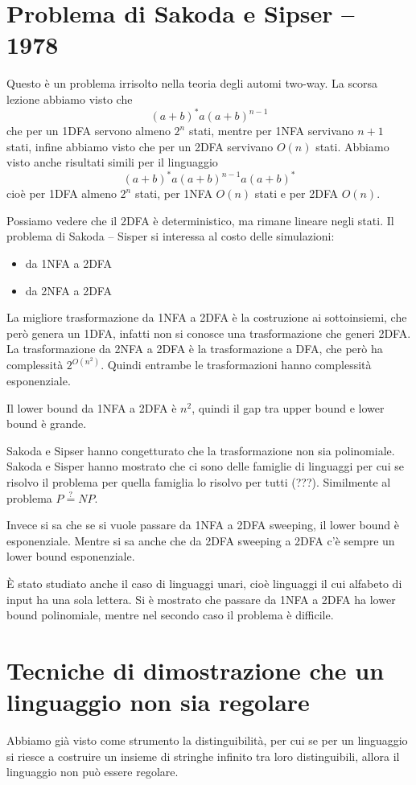 \documentclass[12pt]{article}
\begin{document}
\tableofcontents
\newpage
\section{Problema di Sakoda e Sipser -- 1978}
Questo è un problema irrisolto nella teoria degli automi two-way.
La scorsa lezione abbiamo visto che 
$$ (a + b)^* a (a + b)^{n - 1} $$ %
che per un 1DFA servono almeno $2^n$ stati, mentre per 1NFA servivano $n + 1$ stati, infine abbiamo visto che per un 2DFA servivano $O(n)$ stati.
Abbiamo visto anche risultati simili per il linguaggio
$$ (a + b)^* a (a + b)^{n - 1} a (a + b)^* $$
cioè per 1DFA almeno $2^n$ stati, per 1NFA $O(n)$ stati e per 2DFA $O(n)$.

Possiamo vedere che il 2DFA è deterministico, ma rimane lineare negli stati.
Il problema di Sakoda -- Sisper si interessa al costo delle simulazioni:
\begin{itemize}
	\item da 1NFA a 2DFA
	\item da 2NFA a 2DFA
\end{itemize}
La migliore trasformazione da 1NFA a 2DFA è la costruzione ai sottoinsiemi, che però genera un 1DFA, infatti non si conosce una trasformazione che generi 2DFA.
La trasformazione da 2NFA a 2DFA è la trasformazione a DFA, che però ha complessità $2^{O(n^2)}$.
Quindi entrambe le trasformazioni hanno complessità esponenziale.

Il lower bound da 1NFA a 2DFA è $n^2$, quindi il gap tra upper bound e lower bound è grande.

Sakoda e Sipser hanno congetturato che la trasformazione non sia polinomiale.
Sakoda e Sisper hanno mostrato che ci sono delle famiglie di linguaggi per cui se risolvo il problema per quella famiglia lo risolvo per tutti (???).
Similmente al problema $P \overset{?}{=} NP$.

Invece si sa che se si vuole passare da 1NFA a 2DFA sweeping, il lower bound è esponenziale.
Mentre si sa anche che da 2DFA sweeping a 2DFA c'è sempre un lower bound esponenziale.

\`E stato studiato anche il caso di linguaggi unari, cioè linguaggi il cui alfabeto di input ha una sola lettera.
Si è mostrato che passare da 1NFA a 2DFA ha lower bound polinomiale, mentre nel secondo caso il problema è difficile.

\section{Tecniche di dimostrazione che un linguaggio non sia regolare}
Abbiamo già visto come strumento la distinguibilità, per cui se per un linguaggio si riesce a costruire un insieme di stringhe infinito tra loro distinguibili, allora il linguaggio non può essere regolare.
\end{document}
